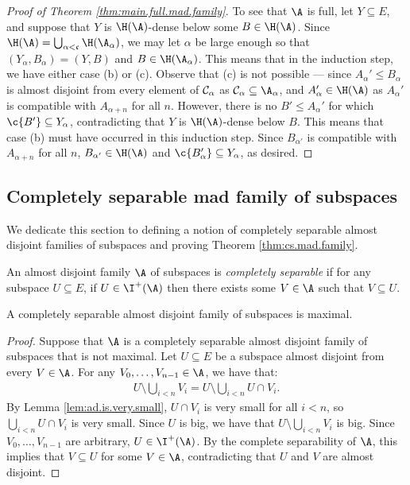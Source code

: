 \documentclass[11pt,reqno]{amsart}
\begin{document}
\begin{proof}[Proof of Theorem \ref{thm:main.full.mad.family}]
    To see that $\A$ is full, let $Y \subseteq E$, and suppose that $Y$ is $\H(\A)$-dense below some $B \in \H(\A)$. Since $\H(\A) = \bigcup_{\alpha<\frak{c}} \H(\A_\alpha)$, we may let $\alpha$ be large enough so that $(Y_\alpha,B_\alpha) = (Y,B)$ and $B \in \H(\A_\alpha)$. This means that in the induction step, we have either case (b) or (c). Observe that (c) is not possible --- since $A_\alpha' \leq B_\alpha$ is almost disjoint from every element of $\cal{C}_\alpha$ as $\cal{C}_\alpha \subseteq \A_\alpha$, and $A_\alpha' \in \H(\A)$ as $A_\alpha'$ is compatible with $A_{\alpha+n}$ for all $n$. However, there is no $B' \leq A_\alpha'$ for which $\c{B'} \subseteq Y_\alpha$, contradicting that $Y$ is $\H(\A)$-dense below $B$. This means that case (b) must have occurred in this induction step. Since $B_{\alpha'}$ is compatible with $A_{\alpha+n}$ for all $n$, $B_{\alpha'} \in \H(\A)$ and $\c{B_\alpha'} \subseteq Y_\alpha$, as desired.
\end{proof}

\subsection{Completely separable mad family of subspaces}
We dedicate this section to defining a notion of completely separable almost disjoint families of subspaces and proving Theorem \ref{thm:cs.mad.family}. 

\begin{definition}
\label{def:cs.mad.family}
    An almost disjoint family $\A$ of subspaces is \emph{completely separable} if for any subspace $U \subseteq E$, if $U \in \I^+(\A)$ then there exists some $V \in \A$ such that $V \subseteq U$.
\end{definition}

\begin{lemma}
    A completely separable almost disjoint family of subspaces is maximal.
\end{lemma}

\begin{proof}
    Suppose that $\A$ is a completely separable almost disjoint family of subspaces that is not maximal. Let $U \subseteq E$ be a subspace almost disjoint from every $V \in \A$. For any $V_0,\dots,V_{n-1} \in \A$, we have that:
    \begin{align*}
        U \setminus \bigcup_{i<n} V_i = U \setminus \bigcup_{i<n} U \cap V_i.
    \end{align*}
    By Lemma \ref{lem:ad.is.very.small}, $U \cap V_i$ is very small for all $i < n$, so $\bigcup_{i<n} U \cap V_i$ is very small. Since $U$ is big, we have that $U \setminus \bigcup_{i<n} V_i$ is big. Since $V_0,\dots,V_{n-1}$ are arbitrary, $U \in \I^+(\A)$. By the complete separability of $\A$, this implies that $V \subseteq U$ for some $V \in \A$, contradicting that $U$ and $V$ are almost disjoint.
\end{proof}
\end{document}
